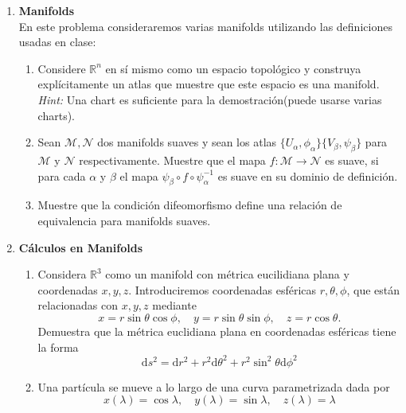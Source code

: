 \documentclass[../main]{subfiles}
\begin{document}
\begin{adjustwidth}{0pt}{-100pt}
\begin{enumerate}
    \item \textbf{Manifolds} \\
    En este problema consideraremos varias manifolds utilizando las definiciones usadas en clase:
    \begin{enumerate}[label=(\alph*)]
        \item Considere $\mathbb{R}^n$ en sí mismo como un espacio topológico y construya explícitamente un atlas que muestre que este espacio es una manifold. \textit{Hint:} Una chart es suficiente para la demostración(puede usarse varias charts).
        \item Sean $\mathcal{M}, \mathcal{N}$ dos manifolds suaves y sean los atlas $\{ U_{\alpha}, \phi_{\alpha}\}\{V_{\beta}, \psi_{\beta}\}$ para $\mathcal{M}$ y $\mathcal{N}$ respectivamente. Muestre que el mapa $f: \mathcal{M} \rightarrow \mathcal{N}$ es suave, si para cada $\alpha$ y $\beta$ el mapa $\psi_{\beta} \circ f \circ \psi^{-1}_{\alpha}$ es suave en su dominio de definición.
        \item Muestre que la condición difeomorfismo define una relación de equivalencia para manifolds suaves.
    \end{enumerate}
    \item \textbf{Cálculos en Manifolds} 
    \begin{enumerate}[label=(\alph*)]
        \item Considera $\mathbb{R}^3$ como un manifold con métrica eucilidiana plana y coordenadas $x, y, z$. Introduciremos coordenadas esféricas $r, \theta, \phi$, que están relacionadas con $x, y, z$ mediante
        \begin{equation}
            x=r \sin \theta \cos \phi, \quad y=r \sin \theta \sin \phi, \quad z=r\cos \theta.
        \end{equation}
        Demuestra que la métrica euclidiana plana en coordenadas esféricas tiene la forma
        \begin{equation}
            \mathrm{d}s^2=\mathrm{d}r^2+r^2 \mathrm{d}\theta^2+r^2\sin^2 \theta \mathrm{d}\phi^2
        \end{equation}
        \item Una partícula se mueve a lo largo de una curva parametrizada dada por
        \begin{equation}
            x(\lambda)=\cos \lambda, \quad y(\lambda)=\sin \lambda, \quad z(\lambda)=\lambda
        \end{equation}
        \begin{itemize}

\end{itemize}
\end{enumerate}
\end{enumerate}
\end{adjustwidth}
\end{document}
